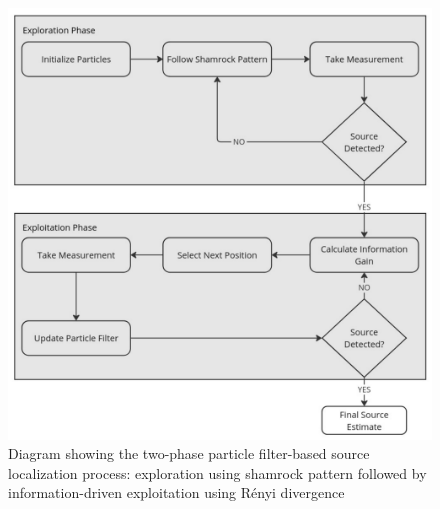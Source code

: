 \documentclass[../report.tex]{subfiles}
\begin{document}
    \begin{figure}[ht]
            \centering
            \includegraphics[width=0.8\linewidth]{figures/entropy_flow.pdf}
            \caption{Diagram showing the two-phase particle filter-based source localization process: exploration using shamrock pattern followed by 
            information-driven exploitation using Rényi divergence}
            \label{fig:rnd_entropy_algorithm_flow}
    \end{figure}
\end{document}
